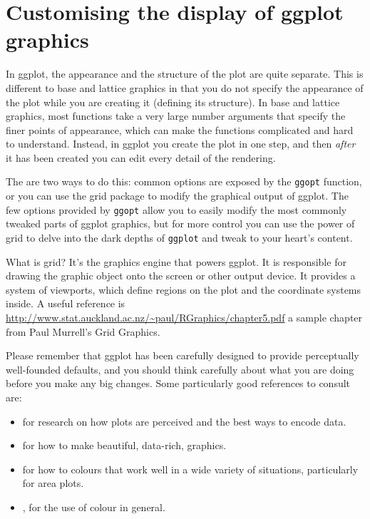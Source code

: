 


\newpage
\chapter{Customising the display of ggplot graphics}

In ggplot, the appearance and the structure of the plot are quite separate.  This is different to base and lattice graphics in that you do not specify the appearance of the plot while you are creating it (defining its structure).  In base and lattice graphics, most functions take a very large number arguments that specify the finer points of appearance, which can make the functions complicated and hard to understand.  Instead, in ggplot you create the plot in one step, and then {\em after} it has been created you can edit every detail of the rendering.  

The are two ways to do this: common options are exposed by the {\tt ggopt} function, or you can use the grid package to modify the graphical output of ggplot.  The few options provided by {\tt ggopt} allow you to easily modify the most commonly tweaked parts of ggplot graphics, but for more control you can use the power of grid to delve into the dark depths of {\tt ggplot} and tweak to your heart's content.

What is grid?  It's the graphics engine that powers ggplot.  It is responsible for drawing the graphic object onto the screen or other output device.  It provides a system of viewports, which define regions on the plot and the coordinate systems inside.  A useful reference is \url{http://www.stat.auckland.ac.nz/~paul/RGraphics/chapter5.pdf} a sample chapter from Paul Murrell's Grid Graphics.

Please remember that ggplot has been carefully designed to provide perceptually well-founded defaults, and you should think carefully about what you are doing before you make any big changes.  Some particularly good references to consult are:

\begin{itemize}
	\item \citet{cleveland:1993,cleveland:1987,cleveland:1994} for research on how plots are perceived and the best ways to encode data.
	\item \citet{tufte:2006,tufte:1990,tufte:1997,tufte:2001} for how to make beautiful, data-rich, graphics.
	\item \citet{brewer:1994,brewer:1994a} for how to colours that work well in a wide variety of situations, particularly for area plots.
	\item \citet{carr:1999,carr:1994,carr:2002}, for the use of colour in general.
\end{itemize}

